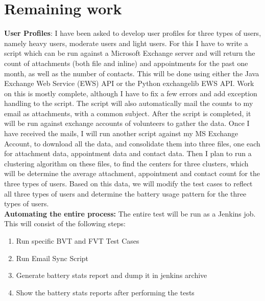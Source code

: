 \documentclass[a4paper,12pt]{article}
\begin{document}
\section{Remaining work} 
\textbf{User Profiles}: I have been asked to develop user profiles for three types of users, namely heavy users, moderate users and light users. For this I have to write a script which can be run against a Microsoft Exchange server and will return the count of attachments (both file and inline) and appointments for the past one month, as well as the number of contacts. This will be done using either the Java Exchange Web Service (EWS) API or the Python exchangelib EWS API. Work on this is mostly complete, although I have to fix a few errors and add exception handling to the script. The script will also automatically mail the counts to my email as attachments, with a common subject. After the script is completed, it will be run against exchange accounts of volunteers to gather the data. Once I have received the mails, I will run another script against my MS Exchange Account, to download all the data, and consolidate them into three files, one each for attachment data, appointment data and contact data. Then I plan to run a clustering algorithm on these files, to find the centers for three clusters, which will be determine the average attachment, appointment and contact count for the three types of users. Based on this data, we will modify the test cases to reflect all three types of users and determine the battery usage pattern for the three types of users.\\

\textbf{Automating the entire process:} The entire test will be run as a Jenkins job. This will consist of the following steps:
\begin{enumerate}
	\item Run specific BVT and FVT Test Cases
	\item Run Email Sync Script
	\item Generate battery stats report and dump it in jenkins archive
	\item Show the battery stats reports after performing the tests

\end{enumerate}
\end{document}
